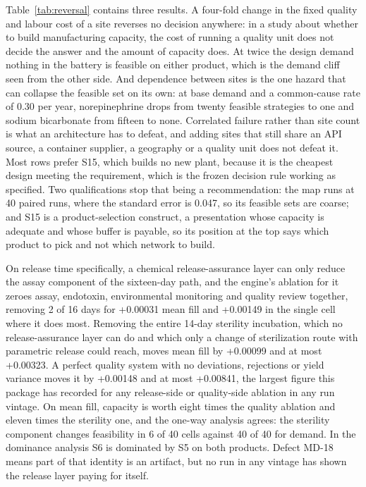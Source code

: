 Table~\ref{tab:reversal} contains three results. A four-fold change in the fixed quality and
labour cost of a site reverses no decision anywhere: in a study about whether to build
manufacturing capacity, the cost of running a quality unit does not decide the answer and the
amount of capacity does. At twice the design demand nothing in the battery is feasible on either
product, which is the demand cliff seen from the other side. And dependence between sites is the
one hazard that can collapse the feasible set on its own: at base demand and a common-cause rate
of 0.30 per year, norepinephrine drops from twenty feasible strategies to one and sodium
bicarbonate from fifteen to none. Correlated failure rather than site count is what an
architecture has to defeat, and adding sites that still share an API source, a container supplier,
a geography or a quality unit does not defeat it. Most rows prefer S15, which builds no new plant,
because it is the cheapest design meeting the requirement, which is the frozen decision rule
working as specified. Two qualifications stop that being a recommendation: the map runs at 40
paired runs, where the standard error is 0.047, so its feasible sets are coarse; and S15 is a
product-selection construct, a presentation whose capacity is adequate and whose buffer is
payable, so its position at the top says which product to pick and not which network to build.

On release time specifically, a chemical release-assurance layer can only reduce the assay
component of the sixteen-day path, and the engine's ablation for it zeroes assay, endotoxin,
environmental monitoring and quality review together, removing 2 of 16 days for +0.00031 mean
fill and +0.00149 in the single cell where it does most. Removing the entire 14-day sterility
incubation, which no release-assurance layer can do and which only a change of sterilization
route with parametric release could reach, moves mean fill by +0.00099 and at most +0.00323. A
perfect quality system with no deviations, rejections or yield variance moves it by +0.00148 and
at most +0.00841, the largest figure this package has recorded for any release-side or
quality-side ablation in any run vintage. On mean fill, capacity is worth eight times the quality
ablation and eleven times the sterility one, and the one-way analysis agrees: the sterility
component changes feasibility in 6 of 40 cells against 40 of 40 for demand. In the dominance
analysis S6 is dominated by S5 on both products. Defect MD-18 means part of that identity is an
artifact, but no run in any vintage has shown the release layer paying for itself.

